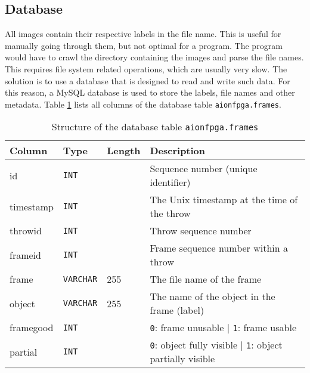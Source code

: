 \subsection{Database}
\label{subsec:database}


All images contain their respective labels in the file name.
This is useful for manually going through them, but not optimal for a program.
The program would have to crawl the directory containing the images and parse the file names.
This requires file system related operations, which are usually very slow.
The solution is to use a database that is designed to read and write such data.
For this reason, a MySQL database is used to store the labels, file names and other metadata.
Table \ref{tab:tab_frames_structure} lists all columns of the database table \texttt{aionfpga.frames}.

\begin{table}[hb]
  \caption{Structure of the database table \texttt{aionfpga.frames}}
  \label{tab:tab_frames_structure}
  \centering
  \begin{tabular}{llll}
    \toprule
    \textbf{Column} & \textbf{Type} & \textbf{Length} & \textbf{Description} \\
    \midrule
    id & \texttt{INT} &  & Sequence number (unique identifier) \\
    timestamp & \texttt{INT} &  & The Unix timestamp at the time of the throw \\
    throwid & \texttt{INT} &  & Throw sequence number \\
    frameid & \texttt{INT} &  & Frame sequence number within a throw \\
    frame & \texttt{VARCHAR} & 255 & The file name of the frame \\
    object & \texttt{VARCHAR} & 255 & The name of the object in the frame (label) \\
    framegood & \texttt{INT} &  & \texttt{0}: frame unusable | \texttt{1}: frame usable \\
    partial & \texttt{INT} &  & \texttt{0}: object fully visible | \texttt{1}: object partially visible \\
    \bottomrule
  \end{tabular}
\end{table}
